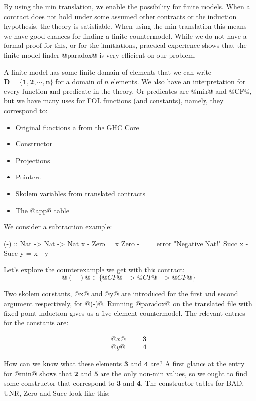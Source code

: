 
By using the min translation, we enable the possibility for finite
models.  When a contract does not hold under some assumed other
contracts or the induction hypothesis, the theory is satisfiable. When
using the min translation this means we have good chances for finding
a finite countermodel. While we do not have a formal proof for this,
or for the limitiations, practical experience shows that the finite
model finder @paradox@ is very efficient on our problem.

A finite model has some finite domain of elements that we can write
$\mathbf{D} = \{\mathbf{1} , \mathbf{2} , \cdots , \mathbf{n}\}$ for a
domain of $n$ elements. We also have an interpretation for every
function and predicate in the theory. Or predicates are @min@ and
@CF@, but we have many uses for FOL functions (and constants), namely,
they correspond to:

\begin{itemize}
    \item Original functions a from the GHC Core
    \item Constructor
    \item Projections
    \item Pointers
    \item Skolem variables from translated contracts
    \item The @app@ table
\end{itemize}

We consider a subtraction example:

\begin{code}
    (-) :: Nat -> Nat -> Nat
    x      - Zero   = x
    Zero   - _      = error "Negative Nat!"
    Succ x - Succ y = x - y
\end{code}

Let's explore the counterexample we get with this contract:
$$@(-)@ \in \{ @CF@ -> @CF@ -> @CF@ \}$$

Two skolem constants, @x@ and @y@ are introduced for the first and
second argument respectively, for @(-)@.  Running @paradox@ on the
translated file with fixed point induction gives us a five element
countermodel. The relevant entries for the constants are:

\[\begin{array}{rcl}
@x@ & = & \mathbf{3} \\
@y@ & = & \mathbf{4}
\end{array}\]

How can we know what these elements $\mathbf{3}$ and $\mathbf{4}$ are?
A first glance at the entry for @min@ shows that $\mathbf{2}$ and
$\mathbf{5}$ are the only non-min values, so we ought to find some
constructor that correspond to $\mathbf{3}$ and $\mathbf{4}$. The
constructor tables for BAD, UNR, Zero and Succ look like this:

